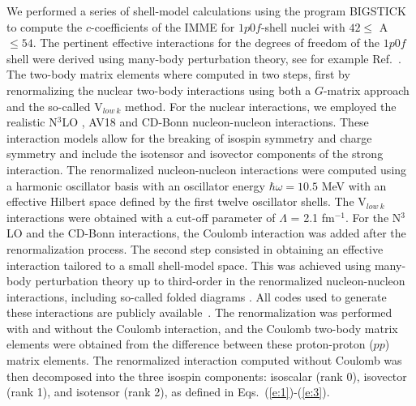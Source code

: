 \documentclass[
10pt,
showpacs,preprintnumbers,footinbib,
amsmath,amssymb,
aps,
prl,twocolumn,groupedaddress,superscriptaddress,
showkeys
]{revtex4-1}
\begin{document}
We performed a series of shell-model calculations using the
program BIGSTICK to compute the $c$-coefficients of the IMME for
$1p0f$-shell nuclei with $ 42 \le $ A $ \le 54$. The pertinent
effective interactions for the degrees of freedom of the $1p0f$ shell
were derived using many-body perturbation theory, see for example
Ref.~\cite{mhj1995}. The two-body matrix elements where computed in
two steps, first by renormalizing the nuclear two-body interactions
using both a $G$-matrix approach and the so-called V$_{low~k}$
method. For the nuclear interactions, we employed the realistic 
N$^3$LO \cite{entem2003}, AV18 \cite{argonne1995} and CD-Bonn
\cite{cdbonn2001} nucleon-nucleon interactions. These interaction models allow
for the breaking of isospin symmetry and charge symmetry and include the
isotensor and isovector components of the strong interaction.  The
renormalized nucleon-nucleon interactions were computed using a
harmonic oscillator basis with an oscillator energy $\hbar\omega
=10.5$ MeV with an effective Hilbert space defined by the first twelve 
oscillator shells. The V$_{low~k}$ interactions were obtained with a
cut-off parameter of $\Lambda$ = 2.1 fm$^{-1}$.  For the N$^3$LO and
the CD-Bonn interactions, the Coulomb interaction was added after the
renormalization process.  The second step consisted in obtaining an
effective interaction tailored to a small shell-model space. This was
achieved using many-body perturbation theory up to third-order in the
renormalized nucleon-nucleon interactions, including so-called folded
diagrams \cite{mhj1995}. All codes used to generate these interactions
are publicly available~\cite{mhjgit}.  The renormalization was
performed with and without the Coulomb interaction, and the Coulomb
two-body matrix elements were obtained from the difference between
these proton-proton ($pp$) matrix elements. The renormalized
interaction computed without Coulomb was then decomposed into the
three isospin components: isoscalar (rank 0), isovector (rank 1), and
isotensor (rank 2), as defined in Eqs.~(\ref{e:1})-(\ref{e:3}).
\end{document}
